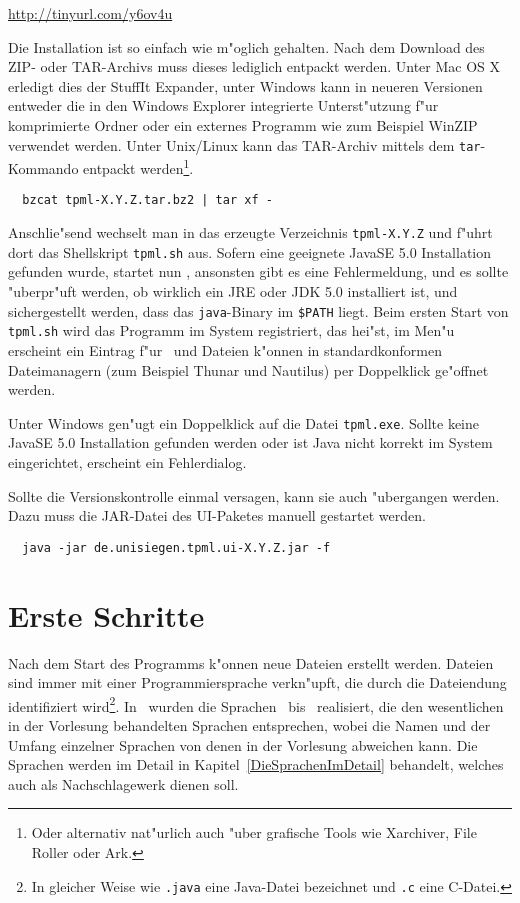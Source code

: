 \url{http://tinyurl.com/y6ov4u}

Die Installation ist so einfach wie m"oglich gehalten. Nach dem Download des ZIP- oder TAR-Archivs muss dieses
lediglich entpackt werden. Unter Mac OS X erledigt dies der StuffIt Expander, unter Windows kann in
neueren Versionen entweder die in den Windows Explorer integrierte Unterst"utzung f"ur komprimierte
Ordner oder ein externes Programm wie zum Beispiel WinZIP verwendet werden. Unter Unix/Linux kann
das TAR-Archiv mittels dem {\tt tar}-Kommando entpackt werden\footnote{Oder alternativ nat"urlich
auch "uber grafische Tools wie Xarchiver, File Roller oder Ark.}.
\begin{verbatim}
  bzcat tpml-X.Y.Z.tar.bz2 | tar xf -
\end{verbatim}
Anschlie"send wechselt man in das erzeugte Verzeichnis {\tt tpml-X.Y.Z} und f"uhrt dort das Shellskript
{\tt tpml.sh} aus. Sofern eine geeignete JavaSE 5.0 Installation gefunden wurde, startet nun \TPML,
ansonsten gibt es eine Fehlermeldung, und es sollte "uberpr"uft werden, ob wirklich ein JRE oder JDK
5.0 installiert ist, und sichergestellt werden, dass das {\tt java}-Binary im {\tt \$PATH} liegt. Beim
ersten Start von {\tt tpml.sh} wird das Programm im System registriert, das hei"st, im Men"u erscheint
ein Eintrag f"ur \TPML\ und Dateien k"onnen in standardkonformen Dateimanagern (zum Beispiel Thunar
und Nautilus) per Doppelklick ge"offnet werden.

Unter Windows gen"ugt ein Doppelklick auf die Datei {\tt tpml.exe}. Sollte keine JavaSE 5.0
Installation gefunden werden oder ist Java nicht korrekt im System eingerichtet, erscheint
ein Fehlerdialog.

Sollte die Versionskontrolle einmal versagen, kann sie auch "ubergangen werden. Dazu muss die JAR-Datei des UI-Paketes manuell gestartet werden.
\begin{verbatim}
  java -jar de.unisiegen.tpml.ui-X.Y.Z.jar -f
\end{verbatim}



\section{Erste Schritte}

Nach dem Start des Programms k"onnen neue Dateien erstellt werden. Dateien sind immer mit einer
Programmiersprache verkn"upft, die durch die Dateiendung identifiziert wird\footnote{In gleicher
Weise wie {\tt .java} eine Java-Datei bezeichnet und {\tt .c} eine C-Datei.}. In \TPML\ wurden
die Sprachen \LZERO\ bis \LFOUR\ realisiert, die den wesentlichen in der Vorlesung behandelten
Sprachen entsprechen, wobei die Namen und der Umfang
einzelner Sprachen von denen in der Vorlesung abweichen kann. Die Sprachen werden im Detail in
Kapitel~\ref{DieSprachenImDetail} behandelt, welches auch als Nachschlagewerk
dienen soll.

